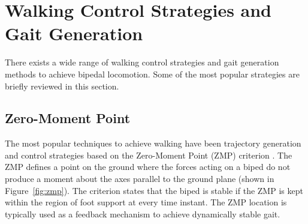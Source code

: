 







\section{Walking Control Strategies and Gait Generation} %
\label{sec:related_control_strategies}
There exists a wide range of walking control strategies and gait generation methods to achieve bipedal locomotion. Some of the most popular strategies are briefly reviewed in this section.


\subsection{Zero-Moment Point} %
\label{sub:related_zero_moment_point}
The most popular techniques to achieve walking have been trajectory generation and control strategies based on the Zero-Moment Point (ZMP) criterion \cite{Vukobratovic:2004wy}. The ZMP defines a point on the ground where the forces acting on a biped do not produce a moment about the axes parallel to the ground plane (shown in Figure~\ref{fig:zmp}). The criterion states that the biped is stable if the ZMP is kept within the region of foot support at every time instant. The ZMP location is typically used as a feedback mechanism to achieve dynamically stable gait.  

